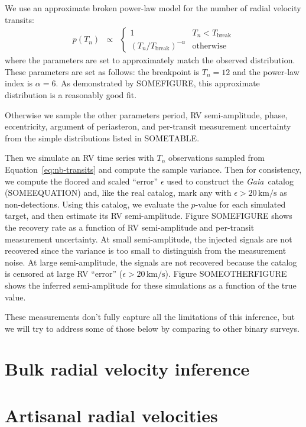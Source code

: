 \documentclass[modern, letterpaper]{aastex63}
\newcommand{\project}[1]{\textsl{#1}}
\newcommand{\Gaia}{\project{Gaia}}
\begin{document}
We use an approximate broken power-law model for the number of radial velocity transits:
\begin{eqnarray}
  \label{eq:nb-transits}
p(T_n) &\propto& \left\{\begin{array}{ll}
  1 & T_n < T_\mathrm{break} \\
  (T_n / T_\mathrm{break})^{-\alpha} & \mathrm{otherwise}
\end{array} \right.
\end{eqnarray}
where the parameters are set to approximately match the observed distribution.
These parameters are set as follows: the breakpoint is $T_n = 12$ and the power-law index is $\alpha = 6$.
As demonstrated by SOMEFIGURE, this approximate distribution is a reasonably good fit.

Otherwise we sample the other parameters period, RV semi-amplitude, phase, eccentricity, argument of periasteron, and per-transit measurement uncertainty from the simple distributions listed in SOMETABLE.

Then we simulate an RV time series with $T_n$ observations sampled from Equation~\ref{eq:nb-transits} and compute the sample variance.
Then for consistency, we compute the floored and scaled ``error'' $\epsilon$ used to construct the \Gaia\ catalog (SOMEEQUATION) and, like the real catalog, mark any with $\epsilon > 20\,\mathrm{km/s}$ as non-detections.
Using this catalog, we evaluate the $p$-value for each simulated target, and then estimate its RV semi-amplitude.
Figure SOMEFIGURE shows the recovery rate as a function of RV semi-amplitude and per-transit measurement uncertainty.
At small semi-amplitude, the injected signals are not recovered since the variance is too small to distinguish from the measurement noise.
At large semi-amplitude, the signals are not recovered because the catalog is censored at large RV ``error'' ($\epsilon > 20\,\mathrm{km/s}$).
Figure SOMEOTHERFIGURE shows the inferred semi-amplitude for these simulations as a function of the true value.

These measurements don't fully capture all the limitations of this inference, but we will try to address some of those below by comparing to other binary surveys.

\section{Bulk radial velocity inference}

\section{Artisanal radial velocities}
\end{document}
